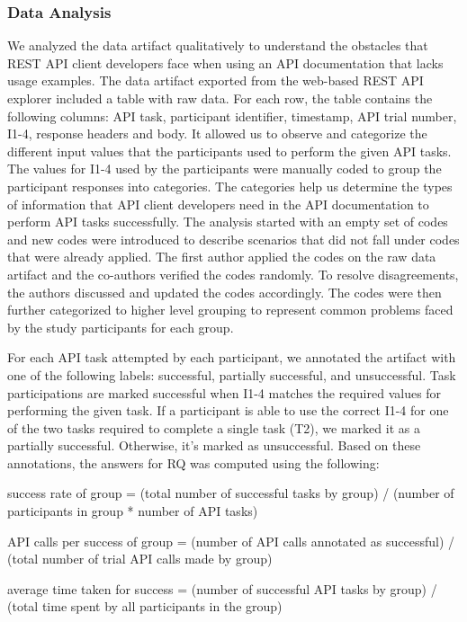 \documentclass[conference]{IEEEtran}
\begin{document}
\subsubsection{Data Analysis}
We analyzed the data artifact qualitatively to understand the obstacles that REST API client developers face when using an API documentation that lacks usage examples. The data artifact exported from the web-based REST API explorer included a table with raw data. For each row, the table contains the following columns: API task, participant identifier, timestamp, API trial number, I1-4, response headers and body. It allowed us to observe and categorize the different input values that the participants used to perform the given API tasks. The values for I1-4 used by the participants were manually coded to group the participant responses into categories. The categories help us determine the types of information that API client developers need in the API documentation to perform API tasks successfully. The analysis started with an empty set of codes and new codes were introduced to describe scenarios that did not fall under  codes that were already applied. The first author applied the codes on the raw data artifact and the co-authors verified the codes randomly. To resolve disagreements, the authors discussed and updated the codes accordingly. The codes were then further categorized to higher level grouping to represent common problems faced by the study participants for each group.

For each API task attempted by each participant, we annotated the artifact with one of the following labels: successful, partially successful, and unsuccessful. Task participations are marked successful when I1-4 matches the required values for performing the given task. If a participant is able to use the correct I1-4 for one of the two tasks required to complete a single task (T2), we marked it as a partially successful. Otherwise, it's marked as unsuccessful. Based on these annotations, the answers for RQ was computed using the following:


success rate of group = (total number of successful tasks by group) / (number of participants in group * number of API tasks)

API calls per success of group = (number of API calls annotated as successful) / (total number of trial API calls made by group)

average time taken for success = (number of successful API tasks by group) / (total time spent by all participants in the group)
\end{document}
